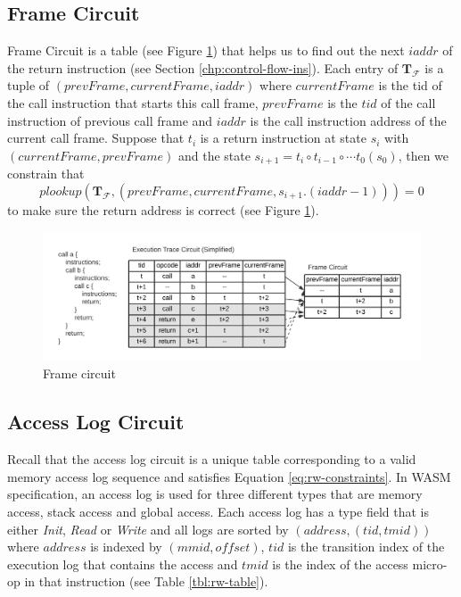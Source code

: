 \subsection{Frame Circuit}
\label{chp:frame-circuit}
Frame Circuit is a table (see Figure \ref{fig:frame-circuit}) that helps us to find out the next $iaddr$ of the return instruction (see Section \ref{chp:control-flow-ins}). Each entry of $\mathbf{T}_\mathcal{F}$ is a tuple of $(prevFrame, currentFrame, iaddr)$  where $currentFrame$ is the tid of the call instruction that starts this call frame, $prevFrame$ is the $tid$ of the call instruction of previous call frame and $iaddr$ is the call instruction address of the current call frame. Suppose that $t_i$ is a return instruction at state $s_i$ with $(currentFrame, prevFrame)$ and the state $s_{i+1} = t_i \circ t_{i-1} \circ \cdots t_0(s_0)$, then we constrain that
\[
    plookup(\mathbf{T}_\mathcal{F}, (prevFrame, currentFrame, s_{i+1}.(iaddr-1))) = 0
\] to make sure the return address is correct (see Figure \ref{fig:frame-circuit}).
\begin{figure}[!h]
\centerline{
\includegraphics[scale=0.7]{figs/frame-circuit.png}
}
\caption{Frame circuit}\label{fig:frame-circuit}
\end{figure}

\subsection{Access Log Circuit}
\label{chp:access-log-circuit}
Recall that the access log circuit is a unique table corresponding to a valid memory access log sequence and satisfies Equation \ref{eq:rw-constraints}. In WASM specification, an access log is used for three different types that are memory access, stack access and global access. Each access log has a type field that is either \emph{Init}, \emph{Read} or \emph{Write} and all logs are sorted by $(address, (tid, tmid))$ where $address$ is indexed by $ (mmid, offset)$, $tid$ is the transition index of the execution log that contains the access and $tmid$ is the index of the access micro-op in that instruction (see Table \ref{tbl:rw-table}).

